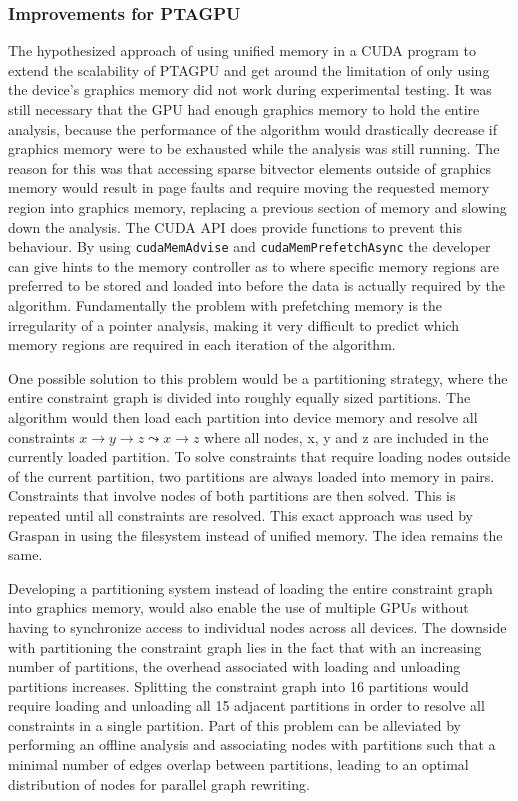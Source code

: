 \subsubsection{Improvements for PTAGPU}
The hypothesized approach of using unified memory in a CUDA program to extend the scalability of PTAGPU and get around the limitation of only using the device's graphics memory did not work during experimental testing.
It was still necessary that the GPU had enough graphics memory to hold the entire analysis, because the performance of the algorithm would drastically decrease if graphics memory were to be exhausted while the analysis was still running. The reason for this was that accessing sparse bitvector elements outside of graphics memory would result in page faults and require moving the requested memory region into graphics memory, replacing a previous section of memory and slowing down the analysis.
The CUDA API does provide functions to prevent this behaviour. By using \verb|cudaMemAdvise| and \verb|cudaMemPrefetchAsync| the developer can give hints to the memory controller as to where specific memory regions are preferred to be stored and loaded into before the data is actually required by the algorithm.
Fundamentally the problem with prefetching memory is the irregularity of a pointer analysis, making it very difficult to predict which memory regions are required in each iteration of the algorithm.

One possible solution to this problem would be a partitioning strategy, where the entire constraint graph is divided into roughly equally sized partitions.
The algorithm would then load each partition into device memory and resolve all constraints  $x \rightarrow y \rightarrow z \mathrel{\leadsto} x \rightarrow z$ where all nodes, x, y and z are included in the currently loaded partition.
To solve constraints that require loading nodes outside of the current partition, two partitions are always loaded into memory in pairs. Constraints that involve nodes of both partitions are then solved. This is repeated until all constraints are resolved.
This exact approach was used by Graspan in \cite{zuo2021systemizing} using the filesystem instead of unified memory. The idea remains the same.

Developing a partitioning system instead of loading the entire constraint graph into graphics memory, would also enable the use of multiple GPUs without having to synchronize access to individual nodes across all devices. 
The downside with partitioning the constraint graph lies in the fact that with an increasing number of partitions, the overhead associated with loading and unloading partitions increases.
Splitting the constraint graph into 16 partitions would require loading and unloading all 15 adjacent partitions in order to resolve all constraints in a single partition.
Part of this problem can be alleviated by performing an offline analysis and associating nodes with partitions such that a minimal number of edges overlap between partitions, leading to an optimal distribution of nodes for parallel graph rewriting.

